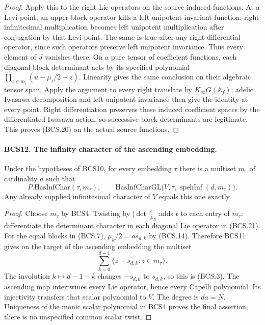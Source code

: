 \begin{proof}
Apply this to the right Lie operators on the source induced
functions.  At a Levi point, an upper-block operator kills a left
unipotent-invariant function: right infinitesimal multiplication
becomes left unipotent multiplication after conjugation by that
Levi point.  The same is true after any right differential operator,
since such operators preserve left unipotent invariance.  Thus every
element of \(J\) vanishes there.  On a pure tensor of coefficient
functions, each diagonal-block determinant acts by its specified
polynomial \(\prod_{z\in m_i}(u-\mu_i/2+z)\).  Linearity gives
the same conclusion on their algebraic tensor span.  Apply the
argument to every right translate by \(K_\infty G(\mathbb A_f)\);
adelic Iwasawa decomposition and left unipotent invariance then give
the identity at every point.  Right differentiation preserves these
induced coefficient spaces by the differentiated Iwasawa action,
so successive block determinants are legitimate.  This proves
(BCS.20) on the actual source functions.
\end{proof}

\paragraph{BCS12. The infinity character of the ascending embedding.}
\label{claim:BCS12}
Under the hypotheses of BCS10, for every embedding \(\tau\) there
is a multiset \(m_\tau\) of cardinality \(a\) such that
\[
 P.\mathrm{HasInfChar}(\tau,m_\tau),\qquad
 \mathrm{HasInfCharGL}\bigl(V,\tau,
                    \operatorname{spehInf}(d,m_\tau)\bigr).
 \tag{BCS.24}
\]
Any already supplied infinitesimal character of \(V\) equals this
one exactly.
\begin{proof}
Choose \(m_\tau\) by BCS4.  Twisting by
\(|\det|_{\mathbb A_E}^{t}\) adds \(t\) to each entry of
\(m_\tau\): differentiate the determinant character in each
diagonal Lie operator in (BCS.21).  For the equal blocks in (BCS.7),
\(\mu_k/2=a s_{d,k}\) by (BCS.14).  Therefore BCS11 gives on
the target of the ascending embedding the multiset
\[
             \sum_{k=0}^{d-1}\{z-s_{d,k}:z\in m_\tau\}.
\]
The involution \(k\mapsto d-1-k\) changes \(-s_{d,k}\) to
\(s_{d,k}\), so this is (BCS.3).  The ascending map intertwines
every Lie operator, hence every Capelli polynomial.  Its injectivity
transfers that scalar polynomial to \(V\).  The degree is
\(da=N\).  Uniqueness of the monic scalar polynomial in BCS4 proves
the final assertion; there is no unspecified common scalar twist.
\end{proof}

